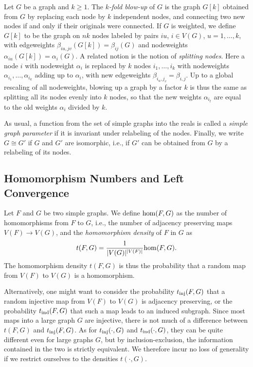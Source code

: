 \documentclass[12pt]{article}
\numberwithin{equation}{section}
\def\hom{{\rm hom}}
\def\inj{{\rm inj}}
\def\inj{{\rm inj}}
\def\ind{{\rm ind}}
\begin{document}
Let $G$ be a graph and $k\ge 1$. The {\it $k$-fold blow-up} of $G$ is
the graph $G[k]$ obtained from $G$ by replacing each node by $k$
independent nodes, and connecting two new nodes if and only if their
originals were connected.  If $G$ is weighted, we define $G[k]$ to be
the graph on $nk$ nodes labeled by pairs $iu$, $i\in V(G)$,
$u=1,\dots, k$, with edgeweights $\beta_{iu,jv}(G[k])=\beta_{ij}(G)$
and nodeweights $\alpha_{iu}(G[k])=\alpha_i(G)$.  A related notion is
the notion of {\it splitting nodes}.  Here a node $i$ with nodeweight
$\alpha_i$ is replaced by $k$ nodes $i_1,\dots, i_k$ with nodeweights
$\alpha_{i_1},\dots,\alpha_{i_k}$ adding up to $\alpha_i$, with new
edgeweights $\beta_{i_u,j_v}=\beta_{i,j}$.  Up to a global rescaling of all
nodeweights, blowing up a graph by a factor $k$ is thus the same as
splitting all its nodes evenly into $k$ nodes, so that the new
weights $\alpha_{i_t}$ are equal to the old weights $\alpha_i$
divided by $k$.

As usual, a function from the set of simple graphs into the reals is
called a {\it simple graph parameter} if it is invariant under
relabeling of the nodes. Finally, we write $G\cong G'$ if $G$ and
$G'$ are isomorphic, i.e., if $G'$ can be obtained from $G$ by a
relabeling of its nodes.

\subsection{Homomorphism Numbers and Left Convergence}

Let $F$ and $G$ be two simple graphs. We  define $\hom(F,G)$ as
the number of homomorphisms from $F$ to $G$, i.e., the number of
adjacency preserving maps $V(F)\to V(G)$, and the {\it homomorphism
density} of $F$ in $G$ as
\[
t(F,G)=\frac {1}{|V(G)|^{|V(F)|}}\hom(F,G).
\]
The homomorphism density $t(F,G)$ is thus the probability that a
random map from $V(F)$ to $V(G)$ is a homomorphism.

Alternatively, one might want to consider the probability
$t_\inj(F,G)$ that a random injective map from $V(F)$ to $V(G)$ is
adjacency preserving, or the probability $t_\ind(F,G)$ that such a
map leads to an induced subgraph. Since most maps into a large graph
$G$ are injective, there is not much of a difference between $t(F,G)$
and $t_\inj(F,G)$. As for $t_\inj(\cdot,G)$ and $t_\ind(\cdot,G)$,
they can be quite different even for large graphs $G$, but by
inclusion-exclusion, the information contained in the two is strictly
equivalent. We therefore incur no loss of generality if we restrict
ourselves to the densities $t(\cdot,G)$.
\end{document}

